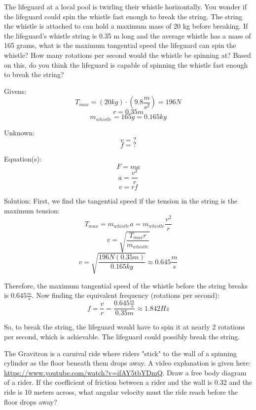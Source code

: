 \begin{Exercise}[title = {Twirling a Whistle}, label = whistle]
The lifeguard at a local pool is twirling their whistle horizontally. You wonder if the lifeguard could spin the whistle fast enough to break the string. The string the whistle is attached to can hold a maximum mass of 20 kg before breaking. If the lifeguard's whistle string is 0.35 m long and the average whistle has a mass of 165 grams, what is the maximum tangential speed the lifeguard can spin the whistle? How many rotations per second would the whistle be spinning at? Based on this, do you think the lifeguard is capable of spinning the whistle fast enough to break the string?
\end{Exercise}

\begin{Answer}[ref = whistle]
Givens:
$$T_{max} = \left( 20 kg \right) \cdot \left( 9.8 \frac{m}{s^2} \right) = 196 N$$
$$r = 0.35 m$$
$$m_{whistle} = 165 g = 0.165 kg$$

Unknown:
$$v = ?$$
$$f = ?$$

Equation(s):
$$F = ma$$
$$a = \frac{v^2}{r}$$
$$v = rf$$

Solution:
First, we find the tangential speed if the tension in the string is the maximum tension:
$$T_{max} = m_{whistle}a = m_{whistle} \frac{v^2}{r}$$
$$v = \sqrt{\frac{T_{max}r}{m_{whistle}}}$$
$$v = \sqrt{\frac{196 N \left(0.35 m \right)}{0.165 kg}} \approx 0.645 \frac{m}{s}$$

Therefore, the maximum tangential speed of the whistle before the string breaks is $0.645 \frac{m}{s}$. Now finding the equivalent frequency (rotations per second):
$$f = \frac{v}{r} = \frac{0.645 \frac{m}{s}}{0.35 m} \approx 1.842 Hz$$

So, to break the string, the lifeguard would have to spin it at nearly 2 rotations per second, which is achievable. The lifeguard could possibly break the string. 
\end{Answer}

\begin{Exercise}[title = {The Gravitron}, label = gravitron]
The Gravitron is a carnival ride where riders "stick" to the wall of a spinning cylinder as the floor beneath them drops away. A video explanation is given here: \url{https://www.youtube.com/watch?v=ifAY5tbYDmQ}. Draw a free body diagram of a rider. If the coefficient of friction between a rider and the wall is 0.32 and the ride is 10 meters across, what angular velocity must the ride reach before the floor drops away?
\end{Exercise}

